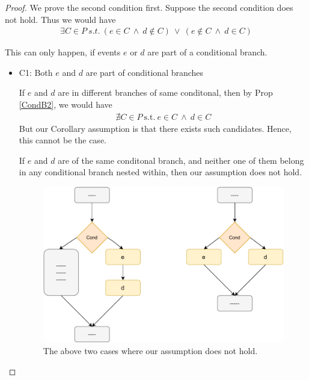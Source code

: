         \begin{proof}
        
            We prove the second condition first. 
            Suppose the second condition does not hold. Thus we would have
            \begin{align*}
                \exists C \in P \ s.t. \ 
                (e \in C \ \wedge \ d \notin C) \ \vee \ 
                (e \notin C \ \wedge \ d \in C)
            \end{align*}

            This can only happen, if events $e$ or $d$ are part of a conditional branch.
            \begin{itemize}
                \item C1: Both $e$ and $d$ are part of conditional branches

                    If $e$ and $d$ are in different branches of same conditonal, then by Prop \ref{CondB2}, we would have 
                    \begin{align*}
                        \nexists C \in P \ \text{s.t.} \ e \in C \ \wedge \ d \in C 
                    \end{align*}
                    But our Corollary assumption is that there exists such candidates. Hence, this cannot be the case.

                    If $e$ and $d$ are of the same conditonal branch, and neither one of them belong in any conditional branch nested within, then our assumption does not hold. 

                    \begin{figure}[H]
                        \centering 
                        \includegraphics[scale=0.7]{InstructionReordering/ConditionalsProofFig1.pdf}
                        \caption{The above two cases where our assumption does not hold.}
                    \end{figure}


\end{itemize}
\end{proof}

